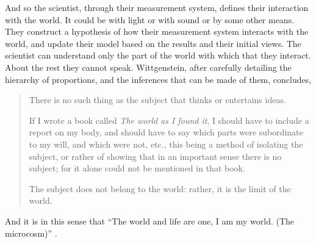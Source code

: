 And so the scientist, through their measurement system, 
defines their interaction with the world.  
It could be with light or with sound or by some other means.  
They construct a hypothesis of how their measurement system interacts with the world,
and update their model based on the results and their initial views.
The scientist can understand only the part of the world with which that they interact.
About the rest they cannot speak.
Wittgenstein\cite{WittgensteinBook}, after  carefully detailing the hierarchy of proportions, and the inferences that can be made of them,
concludes,
\begin{quote}
 There is no such thing as the subject that thinks or entertains
 ideas.

 If I wrote a book called {\em The world as I found it},
 I should have to include a report on my body, and should have to say
 which parts were subordinate to my will,
 and which were not, etc., this being a method of isolating the subject,
 or rather of showing that in an important sense there is no subject;
 for it alone could not be mentioned in that book.

 The subject does not belong to the world: rather, it is the limit of
 the world. 
\end{quote}
And it is in this sense that
 ``The world and life are one, I am my world. (The microcosm)'' \cite{WittgensteinBook}.




